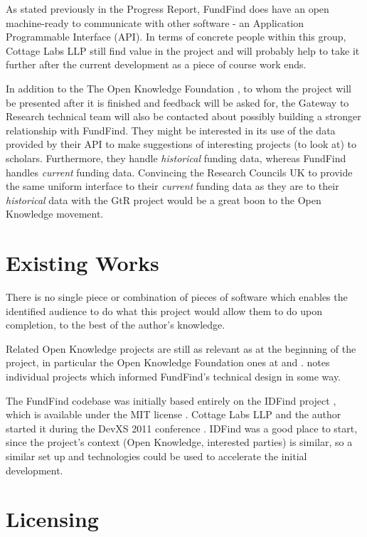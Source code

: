 As stated previously in the Progress Report, FundFind does have an open machine-ready to communicate with other software - an Application Programmable Interface (API). In terms of concrete people within this group, Cottage Labs LLP \cite{cl} still find value in the project and will probably help to take it further after the current development as a piece of course work ends.

In addition to the The Open Knowledge Foundation \cite{okfn-vision}, to whom the project will be presented after it is finished and feedback will be asked for, the Gateway to Research technical team will also be contacted about possibly building a stronger relationship with FundFind. They might be interested in its use of the data provided by their API to make suggestions of interesting projects (to look at) to scholars. Furthermore, they handle \emph{historical} funding data, whereas FundFind handles \emph{current} funding data. Convincing the Research Councils UK to provide the same uniform interface to their \emph{current} funding data as they are to their \emph{historical} data with the GtR project would be a great boon to the Open Knowledge movement.

\section{Existing Works}
\label{existing-works}
There is no single piece or combination of pieces of software which enables the identified audience to do what this project would allow them to do upon completion, to the best of the author's knowledge.

Related Open Knowledge projects are still as relevant as at the beginning of the project, in particular the Open Knowledge Foundation ones at \cite{okfn-labs} and \cite{okfn-github}.  notes individual projects which informed FundFind's technical design in some way.

The FundFind codebase was initially based entirely on the IDFind project \cite{idfind}, which is available under the MIT license \cite{idfind-src}. Cottage Labs LLP and the author started it during the DevXS 2011 conference \cite{devxs}. IDFind was a good place to start, since the project's context (Open Knowledge, interested parties) is similar, so a similar set up and technologies could be used to accelerate the initial development.

\section{Licensing}

